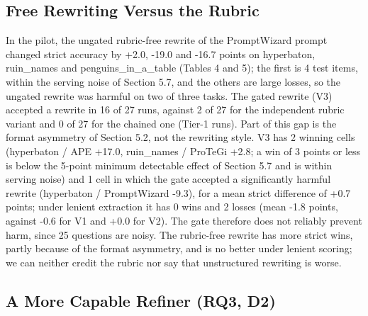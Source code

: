 \documentclass{ieeeaccess}
\begin{document}
\subsection{Free Rewriting Versus the Rubric}

In the pilot, the ungated rubric-free rewrite of the PromptWizard prompt changed strict accuracy by +2.0, -19.0 and -16.7 points on hyperbaton, ruin\_\allowbreak{}names and penguins\_\allowbreak{}in\_\allowbreak{}a\_\allowbreak{}table (Tables 4 and 5); the first is 4 test items, within the serving noise of Section 5.7, and the others are large losses, so the ungated rewrite was harmful on two of three tasks. The gated rewrite (V3) accepted a rewrite in 16 of 27 runs, against 2 of 27 for the independent rubric variant and 0 of 27 for the chained one (Tier-1 runs). Part of this gap is the format asymmetry of Section 5.2, not the rewriting style. V3 has 2 winning cells (hyperbaton / APE +17.0, ruin\_\allowbreak{}names / ProTeGi +2.8; a win of 3 points or less is below the 5-point minimum detectable effect of Section 5.7 and is within serving noise) and 1 cell in which the gate accepted a significantly harmful rewrite (hyperbaton / PromptWizard -9.3), for a mean strict difference of +0.7 points; under lenient extraction it has 0 wins and 2 losses (mean -1.8 points, against -0.6 for V1 and +0.0 for V2). The gate therefore does not reliably prevent harm, since 25 questions are noisy. The rubric-free rewrite has more strict wins, partly because of the format asymmetry, and is no better under lenient scoring; we can neither credit the rubric nor say that unstructured rewriting is worse.

\subsection{A More Capable Refiner (RQ3, D2)}
\end{document}
